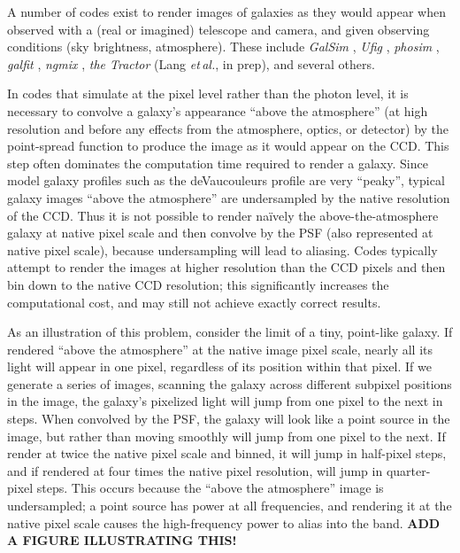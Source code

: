 \documentclass[11pt,preprint]{aastex}
\newcommand{\foreign}[1]{\emph{#1}}
\newcommand{\etal}{\foreign{et\,al.}}
\newcommand{\project}[1]{\textsl{#1}}
\begin{document}
A number of codes exist to render images of galaxies as they would
appear when observed with a (real or imagined) telescope and camera,
and given observing conditions (sky brightness, atmosphere).  These
include \project{GalSim} \citep{galsim}, \project{Ufig} \citep{ufig},
\project{phosim} \citep{phosim}, \project{galfit} \citep{galfit}, 
\project{ngmix} \citep{ngmix},
\project{the Tractor} (Lang \etal, in prep), and several others.


In codes that simulate at the pixel level rather than the photon
level, it is necessary to convolve a galaxy's appearance ``above the
atmosphere'' (at high resolution and before any effects from the
atmosphere, optics, or detector) by the point-spread function to
produce the image as it would appear on the CCD.  This step often
dominates the computation time required to render a galaxy.  Since
model galaxy profiles such as the deVaucouleurs profile are very
``peaky'', typical galaxy images ``above the atmosphere'' are
undersampled by the native resolution of the CCD.  Thus it is not
possible to render na\"ively the above-the-atmosphere galaxy at native
pixel scale and then convolve by the PSF (also represented at native
pixel scale), because undersampling will lead to aliasing.
Codes typically attempt to render the images at higher resolution than the
CCD pixels and then bin down to the native CCD resolution; this
significantly increases the computational cost, and may still not
achieve exactly correct results.



As an illustration of this problem, consider the limit of a tiny,
point-like galaxy.  If rendered ``above the atmosphere'' at the native
image pixel scale, nearly all its light will appear in one pixel,
regardless of its position within that pixel.  If we generate a series
of images, scanning the galaxy across different subpixel positions in
the image, the galaxy's pixelized light will jump from one pixel to
the next in steps.  When convolved by the PSF, the galaxy will look
like a point source in the image, but rather than moving smoothly will
jump from one pixel to the next.  If render at twice the native pixel
scale and binned, it will jump in half-pixel steps, and if rendered at
four times the native pixel resolution, will jump in quarter-pixel
steps.  This occurs because the ``above the atmosphere'' image is
undersampled; a point source has power at all frequencies, and
rendering it at the native pixel scale causes the high-frequency power
to alias into the band.
\textbf{ADD A FIGURE ILLUSTRATING THIS!}
\end{document}
